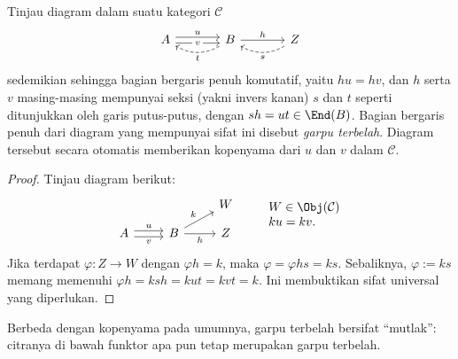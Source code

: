 \begin{definition-proposition}
	Tinjau diagram dalam suatu kategori $\mathcal{C}$
	\begin{equation*}\label{eqn:split-coeq}\begin{tikzcd}[column sep=large]
		A \arrow[shift left, r, "u"] \arrow[shift right, r, "v" description] & B \arrow[r, "h"] \arrow[dashed, l, bend left, "t"] & Z \arrow[dashed, l, bend left, "s"]
	\end{tikzcd}\end{equation*}
	sedemikian sehingga bagian bergaris penuh komutatif, yaitu $hu=hv$, dan
	$h$ serta $v$ masing-masing mempunyai seksi (yakni invers kanan) $s$ dan
	$t$ seperti ditunjukkan oleh garis putus-putus, dengan
	$sh=ut\in\End(B)$. Bagian bergaris penuh dari diagram yang mempunyai sifat
	ini disebut \emph{garpu terbelah}. Diagram tersebut secara otomatis
	memberikan kopenyama dari $u$ dan $v$ dalam $\mathcal{C}$.
\end{definition-proposition}
\begin{proof}
	Tinjau diagram berikut:
	\[\begin{tikzcd}[row sep=small]
		& & W \\
		A \arrow[shift left, r, "u"] \arrow[shift right, r, "v"'] & B \arrow[r, "h"'] \arrow[ru, "k"] & Z
	\end{tikzcd} \qquad \begin{array}{ll}
		W \in \Obj(\mathcal{C}) \\
		ku = kv.
	\end{array} \]
	Jika terdapat $\varphi:Z\to W$ dengan $\varphi h=k$, maka
	$\varphi=\varphi hs=ks$. Sebaliknya, $\varphi:=ks$ memang memenuhi
	$\varphi h=ksh=kut=kvt=k$. Ini membuktikan sifat universal yang
	diperlukan.
\end{proof}

Berbeda dengan kopenyama pada umumnya, garpu terbelah bersifat
``mutlak'': citranya di bawah funktor apa pun tetap merupakan garpu terbelah.

